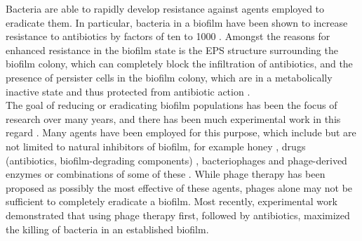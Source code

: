 Bacteria are able to rapidly develop resistance against agents employed to eradicate them. %
In particular, bacteria in a biofilm have been shown to increase resistance to antibiotics by factors of ten to 1000 \citep{davies_understanding_2003}. Amongst the reasons for enhanced resistance in the biofilm state is the EPS structure surrounding the biofilm colony, which can completely block the infiltration of antibiotics, and the presence of persister cells in the biofilm colony, which are in a metabolically inactive state and thus protected from antibiotic action \citep{davies_understanding_2003}.\\

The goal of reducing or eradicating biofilm populations has been the focus of research over many years, and there has been much experimental work in this regard \citep{fleming_approaches_2017, ciofu_antibiotic_2017, feng_bacterial_2015}. Many agents have been employed for this purpose, which include but are not limited to natural inhibitors of biofilm, for example honey \citep{lee_low_2011}, %
drugs (antibiotics, biofilm-degrading components) \citep{lynch_new_2010, mu_potent_2016}, bacteriophages and phage-derived enzymes \citep{azeredo_use_2008, fernandez_low-level_2017, abedon_ecology_2015} or combinations of some of these \citep{chaudhry_synergy_2017}.  While phage therapy has been proposed as possibly the most effective of these agents, phages alone may not be sufficient to completely eradicate a biofilm\citep{abedon_ecology_2015}. Most recently, experimental work demonstrated that
using phage therapy first, followed by antibiotics, maximized the killing of bacteria in an established biofilm.\\

